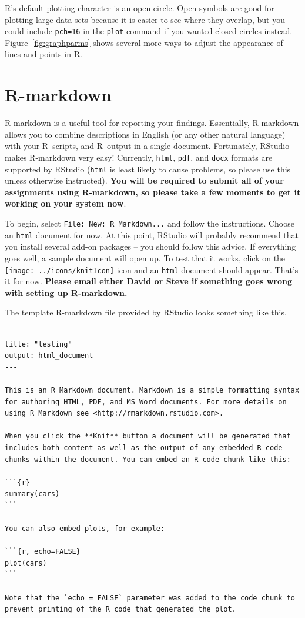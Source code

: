\documentclass[11pt]{article}\usepackage[]{graphicx}\usepackage[]{color}
\newcommand{\code}[1]{{\tt #1}}
\newcommand\R{{\sf R}}
\numberwithin{exercise}{section}
\begin{document}
\R's default plotting character is an open circle.
Open symbols are good for plotting large data sets
because it is easier to see where they
overlap, but you could include \code{pch=16} in the
\code{plot} command if you wanted closed circles instead.
Figure~\ref{fig:graphparms} shows several more
ways to adjust the appearance of lines
and points in \R.

\section{\R-markdown}

\R-markdown is a useful tool for reporting your findings.
Essentially, \R-markdown allows you to combine descriptions in English
(or any other natural language) with your \R\ scripts, and \R\ output
in a single document.  Fortunately, RStudio makes \R-markdown very
easy! Currently, \code{html}, \code{pdf}, and \code{docx} formats are
supported by RStudio (\code{html} is least likely to cause problems,
so please use this unless otherwise instructed).  \textbf{You will be
  required to submit all of your assignments using \R-markdown, so
  please take a few moments to get it working on your system now}.

To begin, select \code{File: New: R Markdown...} and follow the
instructions.  Choose an \code{html} document for now.  At this point,
RStudio will probably recommend that you install several add-on
packages -- you should follow this advice.  If everything goes well, a
sample document will open up.  To test that it works, click on the
\texttt{[image: ../icons/knitIcon]} icon and an \code{html}
document should appear.  That's it for now.  \textbf{Please email
  either David or Steve if something goes wrong with setting up
  \R-markdown.}

The template \R-markdown file provided by RStudio looks something like
this,
\begin{verbatim}
---
title: "testing"
output: html_document
---

This is an R Markdown document. Markdown is a simple formatting syntax
for authoring HTML, PDF, and MS Word documents. For more details on
using R Markdown see <http://rmarkdown.rstudio.com>.

When you click the **Knit** button a document will be generated that
includes both content as well as the output of any embedded R code
chunks within the document. You can embed an R code chunk like this:

```{r}
summary(cars)
```

You can also embed plots, for example:

```{r, echo=FALSE}
plot(cars)
```

Note that the `echo = FALSE` parameter was added to the code chunk to
prevent printing of the R code that generated the plot.
\end{verbatim}
\end{document}
